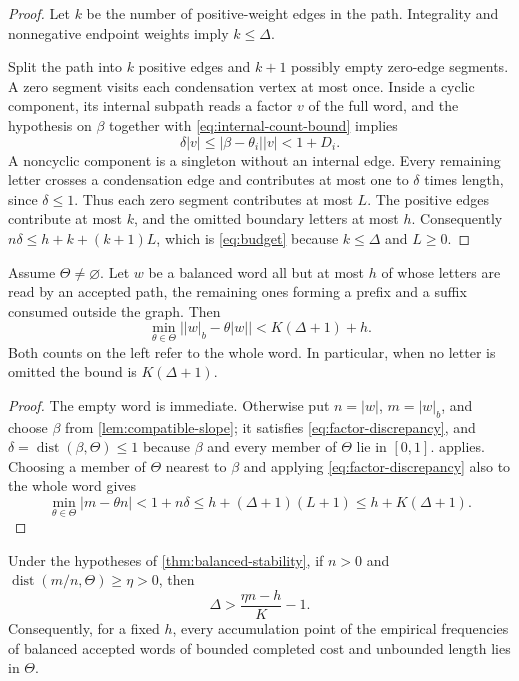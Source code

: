 \begin{proof}
Let $k$ be the number of positive-weight edges in the path. Integrality and
nonnegative endpoint weights imply $k\leqslant\Delta$.

Split the path into $k$ positive edges and $k+1$ possibly empty zero-edge
segments. A zero segment visits each condensation vertex at most once.
Inside a cyclic component, its internal subpath reads a factor $v$ of the
full word, and the hypothesis on $\beta$ together with
\eqref{eq:internal-count-bound} implies
$$
 \delta|v|\leqslant|\beta-\theta_i||v|<1+D_i.
$$
A noncyclic component is a singleton without an internal edge. Every
remaining letter crosses a condensation edge and contributes at most one
to $\delta$ times length, since $\delta\leqslant1$. Thus each zero segment
contributes at most $L$. The positive edges contribute at most $k$, and
the omitted boundary letters at most $h$. Consequently
$n\delta\leqslant h+k+(k+1)L$, which is \eqref{eq:budget} because
$k\leqslant\Delta$ and $L\geqslant0$.
\end{proof}

\begin{theorem}
\label{thm:balanced-stability}
Assume $\Theta\ne\varnothing$. Let $w$ be a balanced word all but at most
$h$ of whose letters are read by an accepted path, the remaining ones
forming a prefix and a suffix consumed outside the graph. Then
\begin{equation}
 \min_{\theta\in\Theta}\bigl||w|_b-\theta|w|\bigr|
 <K(\Delta+1)+h.
 \label{eq:stability-main}
\end{equation}
Both counts on the left refer to the whole word. In particular, when no
letter is omitted the bound is $K(\Delta+1)$.
\end{theorem}

\begin{proof}
The empty word is immediate. Otherwise put $n=|w|$, $m=|w|_b$, and choose
$\beta$ from \cref{lem:compatible-slope}; it satisfies
\eqref{eq:factor-discrepancy}, and
$\delta=\operatorname{dist}(\beta,\Theta)\leqslant1$ because $\beta$ and
every member of $\Theta$ lie in $[0,1]$.  applies. Choosing
a member of $\Theta$ nearest to $\beta$ and applying
\eqref{eq:factor-discrepancy} also to the whole word gives
$$
 \min_{\theta\in\Theta}|m-\theta n|
 <1+n\delta\leqslant h+(\Delta+1)(L+1)
 \leqslant h+K(\Delta+1).
$$
\end{proof}

\begin{corollary}
\label{cor:linear-cost}
Under the hypotheses of \cref{thm:balanced-stability}, if $n>0$ and
$\operatorname{dist}(m/n,\Theta)\geqslant\eta>0$, then
$$
 \Delta>\frac{\eta n-h}{K}-1.
$$
Consequently, for a fixed $h$, every accumulation point of the empirical
frequencies of balanced accepted words of bounded completed cost and
unbounded length lies in $\Theta$.
\end{corollary}

